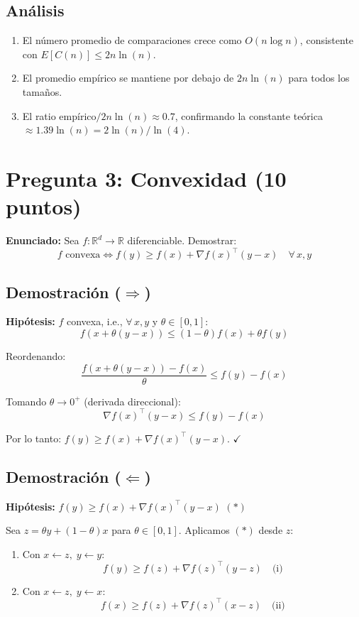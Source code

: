 \documentclass[11pt,a4paper]{article}
\begin{document}
\subsection{Análisis}
\begin{enumerate}
    \item El número promedio de comparaciones crece como $O(n\log n)$, consistente con $E[C(n)] \leq 2n\ln(n)$.
    \item El promedio empírico se mantiene por debajo de $2n\ln(n)$ para todos los tamaños.
    \item El ratio empírico$/2n\ln(n) \approx 0.7$, confirmando la constante teórica $\approx 1.39\ln(n) = 2\ln(n)/\ln(4)$.
\end{enumerate}

\section{Pregunta 3: Convexidad (10 puntos)}

\textbf{Enunciado:} Sea $f:\mathbb{R}^d\to\mathbb{R}$ diferenciable. Demostrar:
\[
f \text{ convexa} \iff f(y) \geq f(x) + \nabla f(x)^\top(y-x) \quad \forall\, x,y
\]

\subsection{Demostración ($\Rightarrow$)}

\textbf{Hipótesis:} $f$ convexa, i.e., $\forall\, x,y$ y $\theta \in [0,1]$:
\[f(x + \theta(y-x)) \leq (1-\theta)f(x) + \theta f(y)\]

Reordenando:
\[\frac{f(x + \theta(y-x)) - f(x)}{\theta} \leq f(y) - f(x)\]

Tomando $\theta \to 0^+$ (derivada direccional):
\[\nabla f(x)^\top(y-x) \leq f(y) - f(x)\]

Por lo tanto: $f(y) \geq f(x) + \nabla f(x)^\top(y-x)$. \hfill$\checkmark$

\subsection{Demostración ($\Leftarrow$)}

\textbf{Hipótesis:} $f(y) \geq f(x) + \nabla f(x)^\top(y-x)$ \quad $(*)$

Sea $z = \theta y + (1-\theta)x$ para $\theta \in [0,1]$. Aplicamos $(*)$ desde $z$:

\begin{enumerate}
    \item Con $x \leftarrow z,\; y \leftarrow y$:
    \[f(y) \geq f(z) + \nabla f(z)^\top(y - z) \quad \text{(i)}\]
    
    \item Con $x \leftarrow z,\; y \leftarrow x$:
    \[f(x) \geq f(z) + \nabla f(z)^\top(x - z) \quad \text{(ii)}\]
\end{enumerate}
\end{document}
